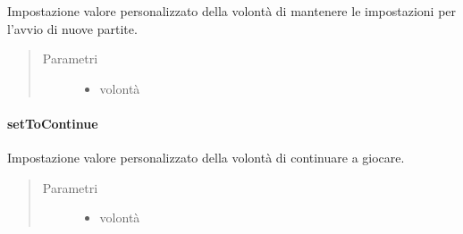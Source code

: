 \documentclass[letterpaper,10pt,italian,openany,oneside]{sphinxmanual}
\begin{document}
\begin{fulllineitems}
\label{\detokenize{test/it/unicam/cs/pa/mastermind/gamecore/StartupSettings:it.unicam.cs.pa.mastermind.gamecore.StartupSettings.setKeepMatchStartSettings(boolean)}}
Impostazione valore personalizzato della volontà di mantenere le impostazioni per l’avvio di nuove partite.
\begin{quote}\begin{description}
\item[{Parametri}] \leavevmode\begin{itemize}
\item {} 
 \textendash{} volontà

\end{itemize}

\end{description}\end{quote}

\end{fulllineitems}



\paragraph{setToContinue}
\label{\detokenize{test/it/unicam/cs/pa/mastermind/gamecore/StartupSettings:settocontinue}}

\begin{fulllineitems}
\label{\detokenize{test/it/unicam/cs/pa/mastermind/gamecore/StartupSettings:it.unicam.cs.pa.mastermind.gamecore.StartupSettings.setToContinue(boolean)}}
Impostazione valore personalizzato della volontà di continuare a giocare.
\begin{quote}\begin{description}
\item[{Parametri}] \leavevmode\begin{itemize}
\item {} 
 \textendash{} volontà

\end{itemize}

\end{description}\end{quote}

\end{fulllineitems}
\end{document}
